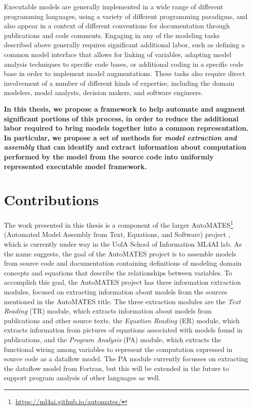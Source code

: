 Executable models are generally implemented in a wide range of different programming languages, using a variety of different programming paradigms, and also appear in a context of different conventions for documentation through publications and code comments. Engaging in any of the modeling tasks described above generally requires significant additional labor, such as defining a common model interface that allows for linking of variables, adapting model analysis techniques to specific code bases, or additional coding in a specific code base in order to implement model augmentations. These tasks also require direct involvement of a number of different kinds of expertise, including the domain modelers, model analysts, decision makers, and software engineers.

{\bf In this thesis, we propose a framework to help automate and augment significant portions of this process, in order to reduce the additional labor required to bring models together into a common representation.
In particular, we propose a set of methods for \textit{model extraction and assembly} that can identify and extract information about computation performed by the model from the source code into uniformly represented executable model framework.}

\section{Contributions\label{sec:contributions}}
The work presented in this thesis is a component of the larger AutoMATES\footnote{\url{https://ml4ai.github.io/automates/}} (Automated Model Assembly from Text, Equations, and Software) project \citep{pyarelal2019}, which is currently under way in the UofA School of Information ML4AI lab.
As the name suggests, the goal of the AutoMATES project is to assemble models from source code and documentation containing definitions of modeling domain concepts and equations that describe the relationships between variables.
To accomplish this goal, the AutoMATES project has three information extraction modules, focused on extracting information about models from the sources mentioned in the AutoMATES title.
The three extraction modules are the \textit{Text Reading} (TR) module, which extracts information about models from publications and other source texts, the \textit{Equation Reading} (ER) module, which extracts information from pictures of equations associated with models found in publications, and the \textit{Program Analysis} (PA) module, which extracts the functional wiring among variables to represent the computation expressed in source code as a dataflow model. The PA module currently focusses on extracting the dataflow model from Fortran, but this will be extended in the future to support program analysis of other languages as well.

